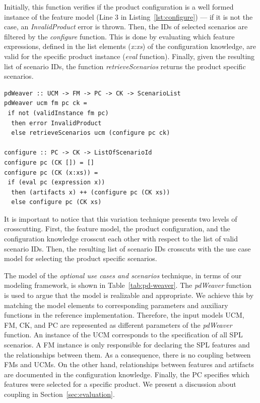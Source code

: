 \documentclass[times, 11pt,twocolumn]{article}
\begin{document}
Initially, this function verifies if the product configuration is a well formed
instance of the feature model (Line 3 in Listing~\ref{lst:configure}) --- if it is not
the case,  an \emph{InvalidProduct} error is thrown. Then, the IDs of selected
scenarios are filtered by the \emph{configure} function. This is done by
evaluating which feature expressions, defined in the list elements (\emph{x:xs})
of the configuration knowledge, are valid for the specific product instance
(\emph{eval} function). Finally, given the resulting list of scenario IDs, the function
\emph{retrieveScenarios} returns the product specific scenarios. 

\begin{lstlisting}[belowskip=10pt,frame=tb,caption={Product derivation weaver function},label=lst:configure]
pdWeaver :: UCM -> FM -> PC -> CK -> ScenarioList
pdWeaver ucm fm pc ck = 
 if not (validInstance fm pc) 
  then error InvalidProduct
  else retrieveScenarios ucm (configure pc ck)

configure :: PC -> CK -> ListOfScenarioId
configure pc (CK []) = []
configure pc (CK (x:xs)) =
 if (eval pc (expression x))
  then (artifacts x) ++ (configure pc (CK xs))
  else configure pc (CK xs)
\end{lstlisting} 

It is important to notice that this variation technique presents two levels of
crosscutting. First, the feature model, the product configuration, and
the configuration knowledge crosscut each other with respect to the
list of valid scenario IDs. Then, the resulting list of scenario IDs crosscuts
with the use case model for selecting the product specific scenarios.   

The model of the \emph{optional use cases and scenarios} technique, in terms of
our modeling framework, is shown in Table~\ref{tab:pd-weaver}. The
\emph{pdWeaver} function is used to argue that the model is realizable and
appropriate. We achieve this by matching the model elements to corresponding
parameters and auxiliary functions in the reference implementation. Therefore,
the input models UCM, FM, CK, and PC are represented as different parameters of
the \emph{pdWeaver} function. An instance of the UCM corresponds to the
specification of all SPL scenarios. A FM instance is only responsible for
declaring the SPL features and the relationships between them. As a consequence,
there is no coupling between FMs and UCMs. On the other hand, relationships
between features and artifacts are documented in the configuration knowledge. Finally, the PC
specifies which features were selected for a specific product. We present a
discussion about coupling in Section~\ref{sec:evaluation}.
\end{document}
